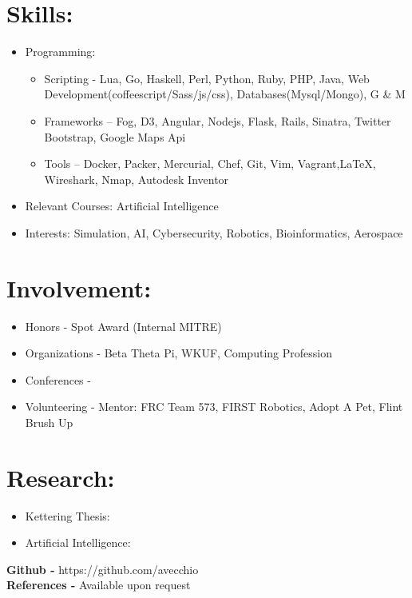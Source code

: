 \documentclass{res}
\begin{document}
\section{Skills:}
\begin{itemize}
\item Programming:
\begin{itemize}[label=$\circ$]
\item Scripting - Lua, Go, Haskell, Perl, Python, Ruby, PHP, Java, Web Development(coffeescript/Sass/js/css), Databases(Mysql/Mongo), G \& M
\item Frameworks – Fog, D3, Angular, Nodejs, Flask, Rails, Sinatra, Twitter Bootstrap, Google Maps Api
\item Tools – Docker, Packer, Mercurial, Chef, Git, Vim, Vagrant,\LaTeX, Wireshark, Nmap, Autodesk Inventor
\end{itemize}
\item Relevant Courses: Artificial Intelligence
\item Interests: Simulation, AI, Cybersecurity, Robotics, Bioinformatics, Aerospace
\end{itemize}

\section{Involvement:}
\begin{itemize}
\item Honors - Spot Award (Internal MITRE)
\item Organizations - Beta Theta Pi, WKUF, Computing Profession
\item Conferences - %
\item Volunteering -  Mentor: FRC Team 573, FIRST Robotics, Adopt A Pet, Flint Brush Up
\end{itemize}

\section{Research:}
\begin{itemize}
\item Kettering Thesis: 
\item Artificial Intelligence:
\end{itemize}

\begin{center}
\textbf{Github - }https://github.com/avecchio\\
\textbf{References - }Available upon request
\end{center}
\end{document}
